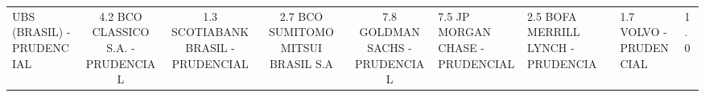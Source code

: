 \begin{table}[htbp]
\begin{tabular}{lcccc}
    UBS (BRASIL) - PRUDENCIAL & 4.2%
    BCO CLASSICO S.A. - PRUDENCIAL & 1.3%
    SCOTIABANK BRASIL - PRUDENCIAL & 2.7%
    BCO SUMITOMO MITSUI BRASIL S.A & 7.8%
    GOLDMAN SACHS - PRUDENCIAL & 7.5%
    JP MORGAN CHASE - PRUDENCIAL & 2.5%
    BOFA MERRILL LYNCH - PRUDENCIA & 1.7%
    VOLVO - PRUDENCIAL & 1.0%
    \hline
  \end{tabular}
\end{table}
